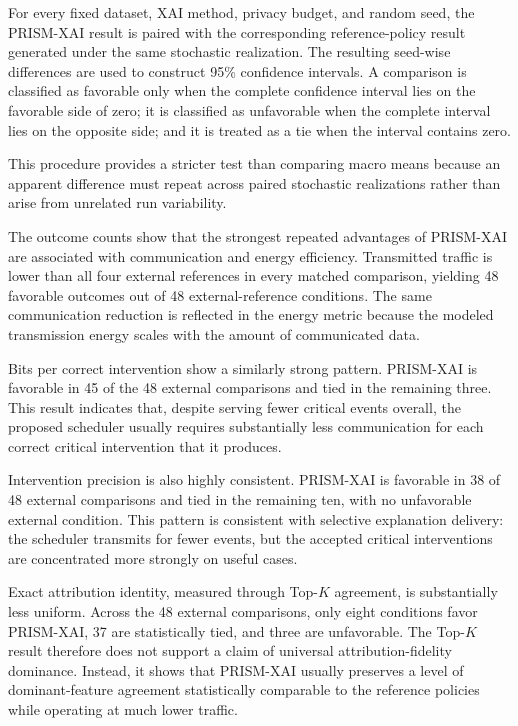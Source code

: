 \documentclass[11pt]{article}
\begin{document}
For every fixed dataset, XAI method, privacy budget, and random seed, the PRISM-XAI result is paired with the corresponding reference-policy result generated under the same stochastic realization. The resulting seed-wise differences are used to construct 95\% confidence intervals. A comparison is classified as favorable only when the complete confidence interval lies on the favorable side of zero; it is classified as unfavorable when the complete interval lies on the opposite side; and it is treated as a tie when the interval contains zero.

This procedure provides a stricter test than comparing macro means because an apparent difference must repeat across paired stochastic realizations rather than arise from unrelated run variability.



The outcome counts show that the strongest repeated advantages of PRISM-XAI are associated with communication and energy efficiency. Transmitted traffic is lower than all four external references in every matched comparison, yielding 48 favorable outcomes out of 48 external-reference conditions. The same communication reduction is reflected in the energy metric because the modeled transmission energy scales with the amount of communicated data.

Bits per correct intervention show a similarly strong pattern. PRISM-XAI is favorable in 45 of the 48 external comparisons and tied in the remaining three. This result indicates that, despite serving fewer critical events overall, the proposed scheduler usually requires substantially less communication for each correct critical intervention that it produces.

Intervention precision is also highly consistent. PRISM-XAI is favorable in 38 of 48 external comparisons and tied in the remaining ten, with no unfavorable external condition. This pattern is consistent with selective explanation delivery: the scheduler transmits for fewer events, but the accepted critical interventions are concentrated more strongly on useful cases.

Exact attribution identity, measured through Top-$K$ agreement, is substantially less uniform. Across the 48 external comparisons, only eight conditions favor PRISM-XAI, 37 are statistically tied, and three are unfavorable. The Top-$K$ result therefore does not support a claim of universal attribution-fidelity dominance. Instead, it shows that PRISM-XAI usually preserves a level of dominant-feature agreement statistically comparable to the reference policies while operating at much lower traffic.
\end{document}
